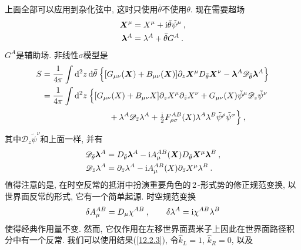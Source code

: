 上面全部可以应用到杂化弦中, 这时只使用$ \bar{\theta} $不使用$ \theta$. 现在需要超场
\begin{subequations}
\begin{align}
    \bm{X}^{\mu} &= X^{\mu}+\mathrm{i}\bar{\theta}\tilde{\psi}^{\mu} \:, \label{12.3.29a} \\
    \bm{\lambda}^{A} &= \lambda^{A} + \bar{\theta}G^{A} \:. \label{12.3.29b} 
\end{align} \label{12.3.29}
\end{subequations}
$G^{A} $是辅助场. 非线性$ \sigma $模型是
\begin{align}
    S&= \frac{1}{4\pi} \int \dif^{2}z\,\dif\bar{\theta}\:\Bigl\{[G_{\mu\nu}(\bm{X})+B_{\mu\nu}(\bm{X})]
    \partial_{z}\bm{X}^{\mu}D_{\bar{\theta}}\bm{X}^{\nu} 
    - \bm{\lambda}^{A}\mathscr{D}_{\bar{\theta}}\bm{\lambda}^{A} \Bigr\} \nonumber \\
    &=\frac{1}{4\pi} \int \dif^{2}z\:\Bigl\{ [G_{\mu\nu}(X)+B_{\mu\nu}X]\partial_{z}X^{\mu}\partial_{\bar{z}}X^{\nu}
    +G_{\mu\nu}(X)\tilde{\psi}^{\mu}\mathscr{D}_{z}\tilde{\psi}^{\nu} \nonumber \\
    &\phantom{=\frac{1}{4\pi} \int \dif^{2}z\:\Bigl\{ [G_{\mu\nu}}+\lambda^{A}\mathscr{D}_{\bar{z}}\lambda^{A}
    +\tfrac{\mi}{2}F_{\rho\sigma}^{AB}(X)\lambda^{A}\lambda^{B}\tilde{\psi}^{\rho}\tilde{\psi}^{\sigma}\Bigr\}\:,
    \label{12.3.30}
\end{align}
其中$ \mathscr{D}_{z}\tilde{\psi}^{\nu} $和上面一样, 并有
\begin{subequations}
\begin{align}
    \mathscr{D}_{\bar{\theta}}\bm{\lambda}^{A}&=D_{\bar{\theta}}\bm{\lambda}^{A}
    -\mathrm{i} A_{\mu}^{AB}(\bm{X})D_{\bar{\theta}}\bm{X}^{\mu}\bm{\lambda}^{B} \:, \label{12.3.31a} \\
    \mathscr{D}_{\bar{z}}\lambda^{A} &= \partial_{\bar{z}}\lambda^{A} 
    - \mathrm{i} A_{\mu}^{AB}(X)\partial_{\bar{z}}X^{\mu}\lambda^{B} \:. \label{12.3.31b}
\end{align} \label{12.3.31}
\end{subequations}
值得注意的是, 在时空反常的抵消中扮演重要角色的\,2\,-形式势的修正规范变换, 以世界面反常的形式, 它有一个简单起源. 
时空规范变换
\begin{equation}
    \delta A_{\mu}^{AB}= D_{\mu}\chi^{AB} \:, \qquad \delta\lambda^{A} = \mathrm{i} \chi^{AB}\lambda^{B} \label{12.3.32}
\end{equation}
使得经典作用量不变. 然而, 它仅作用在左移世界面费米子上因此在世界面路径积分中有一个反常. 我们可以使用结果(\ref{12.2.3}), 令$ \hat{k}_{L}=1$, $\hat{k}_{R}=0$, 以及 
